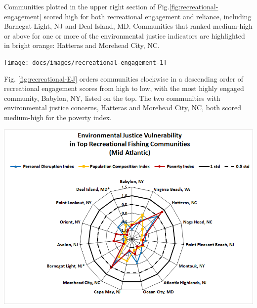 \documentclass[
  10pt,
]{article}
\let\origfigure\figure
\let\endorigfigure\endfigure
\renewenvironment{figure}[1][2] {
    \expandafter\origfigure\expandafter[H]
} {
    \endorigfigure
}
\begin{document}
Communities plotted in the upper right section of
Fig.\ref{fig:recreational-engagement} scored high for both recreational
engagement and reliance, including Barnegat Light, NJ and Deal Island,
MD. Communities that ranked medium-high or above for one or more of the
environmental justice indicators are highlighted in bright orange:
Hatteras and Morehead City, NC.

\begin{figure}

{\centering \texttt{[image: docs/images/recreational-engagement-1]} 

}

\caption{Recreational engagement and reliance, and environmental justice vulnerability, for the top recreationally engaged and reliant fishing communities in the Mid-Atlantic. Communities ranked medium-high or above for one or more of the environmental justice indicators are highlighted in bright orange.}\label{fig:recreational-engagement}
\end{figure}

Fig. \ref{fig:recreational-EJ} orders communities clockwise in a
descending order of recreational engagement scores from high to low,
with the most highly engaged community, Babylon, NY, listed on the top.
The two communities with environmental justice concerns, Hatteras and
Morehead City, NC, both scored medium-high for the poverty index.

\begin{figure}

{\centering \includegraphics[width=0.7\linewidth]{images/EJ_Recreational_MAB} 

}

\caption{Environmental justice indicators (Poverty Index, population composition index, and personal disruption index) for top recreational fishing communities in Mid-Atlantic. *Scored high (1.00 and above)) for both commercial engagement and reliance indicators}\label{fig:recreational-EJ}
\end{figure}
\end{document}
